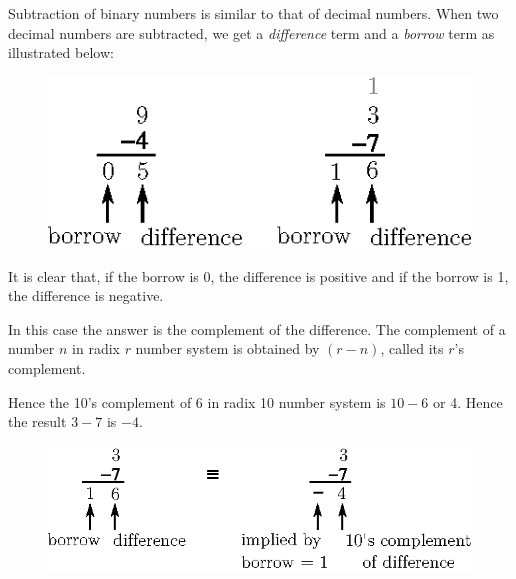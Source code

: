 Subtraction of binary numbers is similar to that of decimal numbers. When two decimal numbers are subtracted, we get a {\em difference} term and a {\em borrow} term as illustrated below:
\begin{figure}[H]
\centering
\includegraphics[scale=1.1]{chap6/fig43.eps}
\end{figure}

It is clear that, if the borrow is 0, the difference is positive and if the borrow is 1, the difference is negative.

In this case the answer is the complement of the difference. The complement of a number $n$ in radix $r$ number system is obtained by $(r-n)$, called its $r$'s complement.

Hence the 10's complement of 6 in radix 10 number system is $10-6$ or 4. Hence the result $3-7$ is $-4$.
\begin{figure}[H]
\centering
\includegraphics[scale=1.1]{chap6/fig44.eps}
\end{figure}

